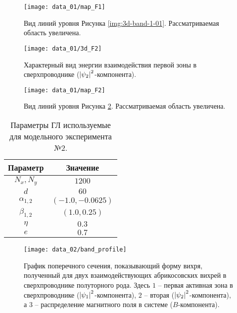 \begin{figure}[h!]
    \center
    \texttt{[image: data\_01/map\_F1]}
    \caption{Вид линий уровня Рисунка \ref{img:3d-band-1-01}. 
        Рассматриваемая область увеличена.}
    \label{img:map-band-1-01}
\end{figure}

\begin{figure}[h!]
    \center
    \texttt{[image: data\_01/3d\_F2]}
    \caption{Характерный вид энергии взаимодействия первой зоны в 
        сверхпроводнике (\( \left| \psi_2 \right|^2 \)-компонента).}
    \label{img:3d-band-2-01}
\end{figure}

\begin{figure}[h!]
    \center
    \texttt{[image: data\_01/map\_F2]}
    \caption{Вид линий уровня Рисунка \ref{img:3d-band-2-01}. 
        Рассматриваемая область увеличена.}
    \label{img:map-band-2-01}
\end{figure}

\clearpage


\begin{table}[h!]
    \centering
    \begin{tabular}{|c|c|}
        \hline 
        Параметр           & Значение              \\ \hline
        \( N_x, N_y \)     & \( 1200 \)            \\ \hline
        \( d \)            & \( 60 \)              \\ \hline
        \( \alpha_{1,2} \) & \( (-1.0, -0.0625) \) \\ \hline
        \( \beta_{1,2} \)  & \( (1.0, 0.25) \)     \\ \hline
        \( \eta \)         & \( 0.3 \)             \\ \hline
        \( e \)            & \( 0.7 \)             \\ \hline
    \end{tabular}
    \caption{Параметры ГЛ используемые для модельного эксперимента №2.}
    \label{param:02}
\end{table}

\begin{figure}[h!]
    \center
    \texttt{[image: data\_02/band\_profile]}
    \caption{График поперечного сечения, показывающий форму вихря, полученный 
        для двух взаимодействующих абрикосовских вихрей в сверхпроводнике 
        полуторного рода. Здесь \( 1 \) -- первая активная зона в 
        сверхпроводнике (\( \left| \psi_1 \right|^2 \)-компонента), \( 2 \) -- вторая 
        (\( \left| \psi_2 \right|^2 \)-компонента), а \( 3 \) -- распределение 
        магнитного поля в системе (\( B \)-компонента).}
    \label{img:band-profile-02}
\end{figure}

